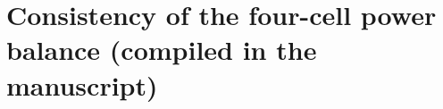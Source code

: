 \documentclass[11pt]{article}
\begin{document}
\section{Consistency of the four-cell power balance (compiled in the manuscript)}\label{sec:four-cell-closure}

\end{document}
